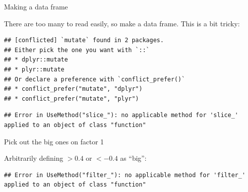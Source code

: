 \documentclass[ignorenonframetext,]{beamer}
\newenvironment{Shaded}{\begin{snugshade}}{\end{snugshade}}
\newcommand{\DataTypeTok}[1]{\textcolor[rgb]{0.13,0.29,0.53}{#1}}
\newcommand{\DecValTok}[1]{\textcolor[rgb]{0.00,0.00,0.81}{#1}}
\newcommand{\FloatTok}[1]{\textcolor[rgb]{0.00,0.00,0.81}{#1}}
\newcommand{\KeywordTok}[1]{\textcolor[rgb]{0.13,0.29,0.53}{\textbf{#1}}}
\newcommand{\NormalTok}[1]{#1}
\newcommand{\OperatorTok}[1]{\textcolor[rgb]{0.81,0.36,0.00}{\textbf{#1}}}
\newcommand{\StringTok}[1]{\textcolor[rgb]{0.31,0.60,0.02}{#1}}
\begin{document}
\begin{frame}[fragile]{Making a data frame}
\protect\hypertarget{making-a-data-frame}{}

There are too many to read easily, so make a data frame. This is a bit
tricky:

\begin{Shaded}
\end{Shaded}

\begin{verbatim}
## [conflicted] `mutate` found in 2 packages.
## Either pick the one you want with `::` 
## * dplyr::mutate
## * plyr::mutate
## Or declare a preference with `conflict_prefer()`
## * conflict_prefer("mutate", "dplyr")
## * conflict_prefer("mutate", "plyr")
\end{verbatim}

\begin{Shaded}
\end{Shaded}

\begin{verbatim}
## Error in UseMethod("slice_"): no applicable method for 'slice_' applied to an object of class "function"
\end{verbatim}

\end{frame}

\begin{frame}[fragile]{Pick out the big ones on factor 1}
\protect\hypertarget{pick-out-the-big-ones-on-factor-1}{}

Arbitrarily defining \(>0.4\) or \(<-0.4\) as ``big'':

\begin{Shaded}
\end{Shaded}

\begin{verbatim}
## Error in UseMethod("filter_"): no applicable method for 'filter_' applied to an object of class "function"
\end{verbatim}

\end{frame}
\end{document}
